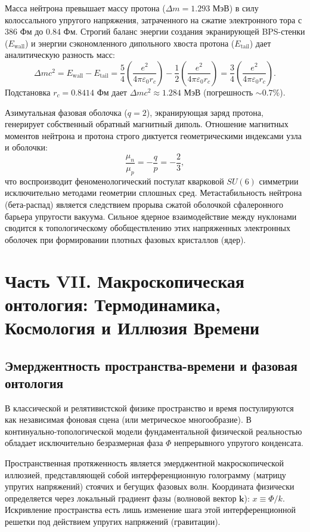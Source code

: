 \documentclass[12pt,a4paper]{article}
\begin{document}
Масса нейтрона превышает массу протона ($\Delta m = 1.293$ МэВ) в силу колоссального упругого напряжения, затраченного на сжатие электронного тора с $386$ Фм до $0.84$ Фм. Строгий баланс энергии создания экранирующей BPS-стенки ($E_{\text{wall}}$) и энергии сэкономленного дипольного хвоста протона ($E_{\text{tail}}$) дает аналитическую разность масс:
\begin{equation}
	\Delta m c^2 = E_{\text{wall}} - E_{\text{tail}} = \frac{5}{4} \left( \frac{e^2}{4\pi\varepsilon_0 r_c} \right) - \frac{1}{2} \left( \frac{e^2}{4\pi\varepsilon_0 r_c} \right) = \frac{3}{4} \left( \frac{e^2}{4\pi\varepsilon_0 r_c} \right).
\end{equation}
Подстановка $r_c = 0.8414$ Фм дает $\Delta m c^2 \approx 1.284$ МэВ (погрешность $\sim 0.7\%$).

Азимутальная фазовая оболочка ($q=2$), экранирующая заряд протона, генерирует собственный обратный магнитный диполь. Отношение магнитных моментов нейтрона и протона строго диктуется геометрическими индексами узла и оболочки:
\begin{equation}
	\frac{\mu_n}{\mu_p} = -\frac{q}{p} = -\frac{2}{3},
\end{equation}
что воспроизводит феноменологический постулат кварковой $SU(6)$ симметрии исключительно методами геометрии сплошных сред. Метастабильность нейтрона (бета-распад) является следствием прорыва сжатой оболочкой сфалеронного барьера упругости вакуума. Сильное ядерное взаимодействие между нуклонами сводится к топологическому обобществлению этих напряженных электронных оболочек при формировании плотных фазовых кристаллов (ядер).

\section{Часть VII. Макроскопическая онтология: Термодинамика, Космология и Иллюзия Времени}

\subsection{Эмерджентность пространства-времени и фазовая онтология}
В классической и релятивистской физике пространство и время постулируются как независимая фоновая сцена (или метрическое многообразие). В континуально-топологической модели фундаментальной физической реальностью обладает исключительно безразмерная фаза $\Phi$ непрерывного упругого конденсата. 

Пространственная протяженность является эмерджентной макроскопической иллюзией, представляющей собой интерференционную голограмму (матрицу упругих напряжений) стоячих и бегущих фазовых волн. Координата физически определяется через локальный градиент фазы (волновой вектор $\mathbf{k}$): $x \equiv \Phi / k$. Искривление пространства есть лишь изменение шага этой интерференционной решетки под действием упругих напряжений (гравитации).
\end{document}
